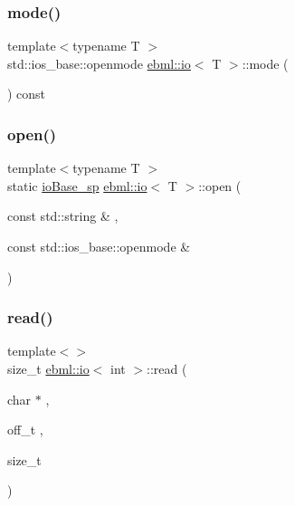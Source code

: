 \mbox{\label{classebml_1_1io_ab1143b5c835958387d95695151744d33}} 
\subsubsection{\texorpdfstring{mode()}{mode()}}
{\footnotesize\ttfamily template$<$typename T $>$ \\
std\+::ios\+\_\+base\+::openmode \mbox{\hyperlink{classebml_1_1io}{ebml\+::io}}$<$ T $>$\+::mode (\begin{DoxyParamCaption}{ }\end{DoxyParamCaption}) const}

\mbox{\label{classebml_1_1io_a98871b6a6ceafc80df00f95867b7cbe4}} 
\subsubsection{\texorpdfstring{open()}{open()}}
{\footnotesize\ttfamily template$<$typename T $>$ \\
static \mbox{\hyperlink{namespaceebml_a7bb59128ac6af27e47367938a846b569}{io\+Base\+\_\+sp}} \mbox{\hyperlink{classebml_1_1io}{ebml\+::io}}$<$ T $>$\+::open (\begin{DoxyParamCaption}\item[{const std\+::string \&}]{,  }\item[{const std\+::ios\+\_\+base\+::openmode \&}]{ }\end{DoxyParamCaption})\hspace{0.3cm}{\ttfamily [static]}}

\mbox{\label{classebml_1_1io_a3b291aa8fb7bbeeb3f9d2ef152c37115}} 
\subsubsection{\texorpdfstring{read()}{read()}\hspace{0.1cm}{\footnotesize\ttfamily [1/2]}}
{\footnotesize\ttfamily template$<$$>$ \\
size\+\_\+t \mbox{\hyperlink{classebml_1_1io}{ebml\+::io}}$<$ int $>$\+::read (\begin{DoxyParamCaption}\item[{char $\ast$}]{,  }\item[{off\+\_\+t}]{,  }\item[{size\+\_\+t}]{ }\end{DoxyParamCaption})\hspace{0.3cm}{\ttfamily [virtual]}}




